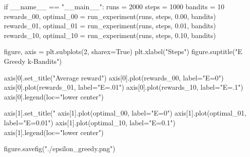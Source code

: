 \documentclass{article}
\begin{document}
\begin{python}
if __name__ == "__main__":
    runs = 2000
    steps = 1000
    bandits = 10
    rewards_00, optimal_00 = run_experiment(runs, steps, 0.00, bandits)
    rewards_01, optimal_01 = run_experiment(runs, steps, 0.01, bandits)
    rewards_10, optimal_10 = run_experiment(runs, steps, 0.10, bandits)

    figure, axis = plt.subplots(2, sharex=True)
    plt.xlabel("Steps")
    figure.suptitle("E Greedy k-Bandits")

    axis[0].set_title("Average reward")
    axis[0].plot(rewards_00, label="E=0")
    axis[0].plot(rewards_01, label="E=.01")
    axis[0].plot(rewards_10, label="E=.1")
    axis[0].legend(loc="lower center")

    axis[1].set_title("%
    axis[1].plot(optimal_00, label="E=0")
    axis[1].plot(optimal_01, label="E=0.01")
    axis[1].plot(optimal_10, label="E=0.1")
    axis[1].legend(loc="lower center")

    figure.savefig("./epsilon_greedy.png")


\end{python}
\end{document}

